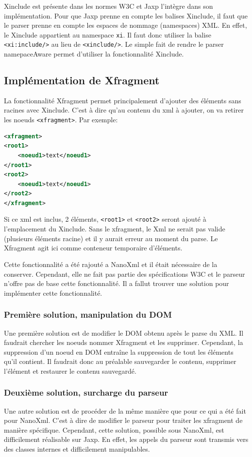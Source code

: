 Xinclude est présente dans les normes W3C et Jaxp l'intègre dans son implémentation.
Pour que Jaxp prenne en compte les balises Xinclude, il faut que le parser prenne en compte les espaces de nommage (namespaces) XML.
En effet, le Xinclude appartient au namespace \verb|xi|.
Il faut donc utiliser la balise \verb|<xi:include/>| au lieu de \verb|<xinclude/>|.
Le simple fait de rendre le parser namepaceAware permet d'utiliser la fonctionnalité Xinclude.
\subsection{Implémentation de Xfragment}
La fonctionnalité Xfragment permet principalement d'ajouter des éléments sans racines avec Xinclude.
C'est à dire qu'au contenu du xml à ajouter, on va retirer les noeuds \verb|<xfragment>|.
Par exemple:
\begin{lstlisting}[language=xml]
<xfragment>
<root1>
	<noeud1>text</noeud1>
</root1>
<root2>
	<noeud1>text</noeud1>
</root2>
</xfragment>
\end{lstlisting}
Si ce xml est inclus, 2 éléments, \verb|<root1>| et \verb|<root2>| seront ajouté à l'emplacement du Xinclude.
Sans le xfragment, le Xml ne serait pas valide (plusieurs éléments racine) et il y aurait erreur au moment du parse.
Le Xfragment agit ici comme conteneur temporaire d'éléments.

Cette fonctionnalité a été rajouté a NanoXml et il était nécessaire de la conserver.
Cependant, elle ne fait pas partie des spécifications W3C et le parseur n'offre pas de base cette fonctionnalité.
Il a fallut trouver une solution pour implémenter cette fonctionnalité.
\subsubsection{Première solution, manipulation du DOM}
Une première solution est de modifier le DOM obtenu après le parse du XML. 
Il faudrait chercher les noeuds nommer Xfragment et les supprimer.
Cependant, la suppression d'un noeud en DOM entraîne la suppression de tout les éléments qu'il contient.
Il faudrait donc au préalable sauvegarder le contenu, supprimer l'élément et restaurer le contenu sauvegardé.
\subsubsection{Deuxième solution, surcharge du parseur}
Une autre solution est de procéder de la même manière que pour ce qui a été fait pour NanoXml.
C'est à dire de modifier le parseur pour traiter les xfragment de manière spécifique.
Cependant, cette solution, possible sous NanoXml, est difficilement réalisable sur Jaxp. 
En effet, les appels du parseur sont transmis vers des classes internes et difficilement manipulables.
